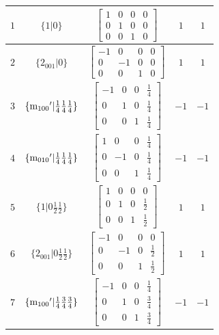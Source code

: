 \documentclass[fleqn,8pt]{jsarticle}
\begin{document}
\begin{longtable}{ccccc}
$ 1 $ & $ \{1|0\} $ & $ \begin{bmatrix} 1 & 0 & 0 & 0 \\ 0 & 1 & 0 & 0 \\ 0 & 0 & 1 & 0 \end{bmatrix} $ & $ 1 $ & $ 1 $ \\ \hline
$ 2 $ & $ \{2{}_{001}|0\} $ & $ \begin{bmatrix} -1 & 0 & 0 & 0 \\ 0 & -1 & 0 & 0 \\ 0 & 0 & 1 & 0 \end{bmatrix} $ & $ 1 $ & $ 1 $ \\ \hline
$ 3 $ & $ \{{\rm m}_{100}{}'|\frac{1}{4} \frac{1}{4} \frac{1}{4}\} $ & $ \begin{bmatrix} -1 & 0 & 0 & \frac{1}{4} \\ 0 & 1 & 0 & \frac{1}{4} \\ 0 & 0 & 1 & \frac{1}{4} \end{bmatrix} $ & $ -1 $ & $ -1 $ \\ \hline
$ 4 $ & $ \{{\rm m}_{010}{}'|\frac{1}{4} \frac{1}{4} \frac{1}{4}\} $ & $ \begin{bmatrix} 1 & 0 & 0 & \frac{1}{4} \\ 0 & -1 & 0 & \frac{1}{4} \\ 0 & 0 & 1 & \frac{1}{4} \end{bmatrix} $ & $ -1 $ & $ -1 $ \\ \hline
$ 5 $ & $ \{1|0 \frac{1}{2} \frac{1}{2}\} $ & $ \begin{bmatrix} 1 & 0 & 0 & 0 \\ 0 & 1 & 0 & \frac{1}{2} \\ 0 & 0 & 1 & \frac{1}{2} \end{bmatrix} $ & $ 1 $ & $ 1 $ \\ \hline
$ 6 $ & $ \{2{}_{001}|0 \frac{1}{2} \frac{1}{2}\} $ & $ \begin{bmatrix} -1 & 0 & 0 & 0 \\ 0 & -1 & 0 & \frac{1}{2} \\ 0 & 0 & 1 & \frac{1}{2} \end{bmatrix} $ & $ 1 $ & $ 1 $ \\ \hline
$ 7 $ & $ \{{\rm m}_{100}{}'|\frac{1}{4} \frac{3}{4} \frac{3}{4}\} $ & $ \begin{bmatrix} -1 & 0 & 0 & \frac{1}{4} \\ 0 & 1 & 0 & \frac{3}{4} \\ 0 & 0 & 1 & \frac{3}{4} \end{bmatrix} $ & $ -1 $ & $ -1 $ \\ \hline

\end{longtable}
\end{document}
